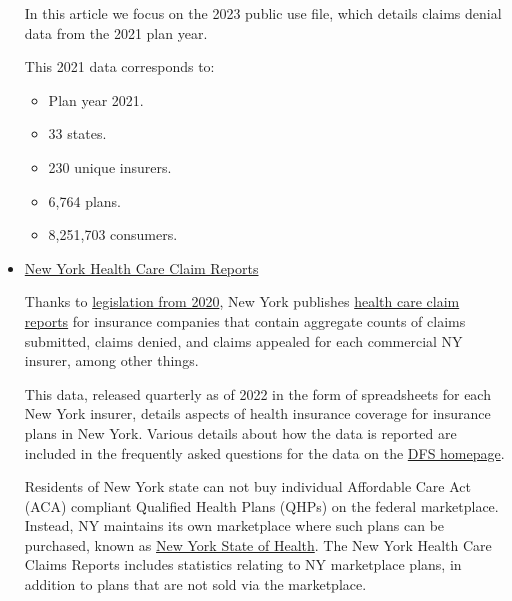\documentclass[12pt, a4paper,twoside,parskip=full]{report}
\theoremstyle{plain} %
\theoremstyle{definition} %
\theoremstyle{remark} %
\numberwithin{equation}{chapter}
\begin{document}
\begin{itemize}
\begin{tcolorbox}
			In this article we focus on the 2023 public use file, which details claims denial data from the 2021 plan year.
			
			This 2021 data corresponds to:
			
			\begin{itemize}
				\item Plan year 2021.
				\item 33 states.
				\item 230 unique insurers.
				\item 6,764 plans.
				\item 8,251,703 consumers.
			\end{itemize}
		
			\end{tcolorbox}
			\item \href{https://www.dfs.ny.gov/reports_and_publications/health_care_claim_reports}{New York Health Care Claim Reports}\\
			
			\begin{tcolorbox}
			Thanks to \href{https://www.nysenate.gov/legislation/laws/ISC/345}{legislation from 2020}, New York publishes \href{https://www.dfs.ny.gov/reports_and_publications/health_care_claim_reports}{health care claim reports} for insurance companies that contain aggregate counts of claims submitted, claims denied, and claims appealed for each commercial NY insurer, among other things.
			
			This data, released quarterly as of 2022 in the form of spreadsheets for each New York insurer, details aspects of health insurance coverage for insurance plans in New York. Various details about how the data is reported are included in the frequently asked questions for the data on the \href{https://www.dfs.ny.gov/apps_and_licensing/health_care_claim_reports}{DFS homepage}. 
			
			Residents of New York state can not buy individual Affordable Care Act (ACA) compliant Qualified Health Plans (QHPs) on the federal marketplace. Instead, NY maintains its own marketplace where such plans can be purchased, known as \href{https://nystateofhealth.ny.gov/}{New York State of Health}. The New York Health Care Claims Reports includes statistics relating to NY marketplace plans, in addition to plans that are not sold via the marketplace. 
			
			

\end{tcolorbox}
\end{itemize}
\end{document}
